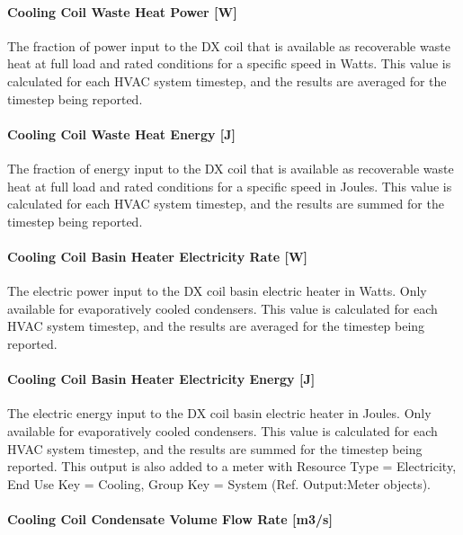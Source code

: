 \paragraph{Cooling Coil Waste Heat Power {[}W{]}}

The fraction of power input to the DX coil that is available as recoverable waste heat at full load and rated conditions for a specific speed in Watts. This value is calculated for each HVAC system timestep, and the results are averaged for the timestep being reported.

\paragraph{Cooling Coil Waste Heat Energy {[}J{]}}

The fraction of energy input to the DX coil that is available as recoverable waste heat at full load and rated conditions for a specific speed in Joules. This value is calculated for each HVAC system timestep, and the results are summed for the timestep being reported.

\paragraph{Cooling Coil Basin Heater Electricity Rate {[}W{]}}

The electric power input to the DX coil basin electric heater in Watts. Only available for evaporatively cooled condensers. This value is calculated for each HVAC system timestep, and the results are averaged for the timestep being reported.

\paragraph{Cooling Coil Basin Heater Electricity Energy {[}J{]}}

The electric energy input to the DX coil basin electric heater in Joules. Only available for evaporatively cooled condensers. This value is calculated for each HVAC system timestep, and the results are summed for the timestep being reported. This output is also added to a meter with Resource Type = Electricity, End Use Key = Cooling, Group Key = System (Ref. Output:Meter objects).

\paragraph{Cooling Coil Condensate Volume Flow Rate {[}m3/s{]}}

